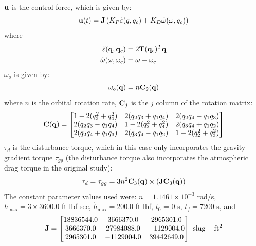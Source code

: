 \documentclass[a4paper,11pt]{report}    %
\newcommand{\mt}[1]{\ensuremath \mathbf{#1}}
\begin{document}
$\mt{u}$ is the control force, which is given by:
\begin{equation}
  \mt{u}(t) = \mt{J} \left( K_P \tilde \varepsilon(q,q_c) + K_D \tilde \omega(\omega,q_c) \right)
\end{equation}
where 
\begin{equation}
\begin{aligned}
  \tilde{\varepsilon}(\mt{q},\mt{q}_c) &= 2 \mt{T}(\mt{q}_c)^T \mt{q} \\
  \tilde \omega( \omega, \omega_c) &=  \omega- \omega_c
\end{aligned}
\end{equation}
$\omega_o$ is given by:
\begin{equation}
  \omega_o(\mt{q}) = n \mt{C}_2(\mt{q})
\end{equation}
where $n$ is the orbital rotation rate, $\mt{C}_j$ is the $j$ column of the rotation matrix:
\begin{equation}
  \mt{C}(\mt{q}) = \begin{bmatrix}   
               1-2(q_3^2+q_4^2)         &     2(q_2 q_3+ q_1 q_4)    &    2(q_2 q_4 - q_1 q_3 )   \\
               2(q_2q_3-q_1q_4)         &     1-2(q_2^2 + q_4^2)    &    2(q_3 q_4 + q_1 q_2 )   \\
               2(q_2 q_4+q_1 q_3)       &    2(q_3 q_4 - q_1 q_2)   &    1-2(q_2^2 + q_3^2)
              \end{bmatrix}
\end{equation}
$\tau_d$ is the disturbance torque, which in this case only incorporates the gravity gradient torque $\tau_{gg}$ (the disturbance torque also
incorporates the atmospheric drag torque in the original study):
\begin{equation}
\begin{aligned}
  \tau_d = \tau_{gg} = 3 n^2 \mt{C}_3(\mt{q}) \times (\mt{J} \mt{C}_3(\mt{q}) )
\end{aligned}
\end{equation}
The constant parameter values used were: $n=1.1461\times 10^{-3}$ rad/s, $h_{\max}= 3 \times 3600.0$ ft-lbf-sec, $\dot h_{\max} = 200.0$ ft-lbf, $t_0$ = 0 s,
$t_f= 7200$ s, and
\begin{equation}
  \mt{J} = \begin{bmatrix}
	18836544.0 & 3666370.0 & 2965301.0 \\
	3666370.0  & 27984088.0 & -1129004.0 \\ 
	2965301.0  & -1129004.0 &  39442649.0 
  \end{bmatrix} \,\, \mathrm{slug-ft^2}
\end{equation}
\end{document}
